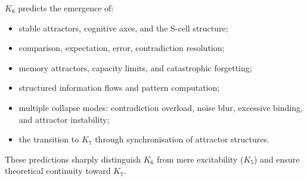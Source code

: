 $K_6$ predicts the emergence of:
\begin{itemize}
    \item stable attractors, cognitive axes, and the S-cell structure;
    \item comparison, expectation, error, contradiction resolution;
    \item memory attractors, capacity limits, and catastrophic forgetting;
    \item structured information flows and pattern computation;
    \item multiple collapse modes: contradiction overload, noise blur,
    excessive binding, and attractor instability;
    \item the transition to $K_7$ through synchronisation of attractor structures.
\end{itemize}

These predictions sharply distinguish $K_6$ from mere excitability ($K_5$) and
ensure theoretical continuity toward $K_7$.
